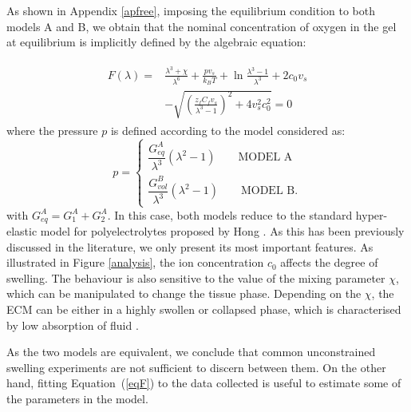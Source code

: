 \documentclass[runningheads]{llncs}
\begin{document}
As shown in Appendix \ref{apfree}, imposing the equilibrium condition to both models A and B, we obtain that the nominal concentration of oxygen in the gel at equilibrium is implicitly defined by the algebraic equation:

\begin{gather}
\begin{aligned}
F(\lambda)=&\frac{\lambda^3+\chi}{\lambda^6}+\frac{p v_s}{k_BT}+\ln \frac{\lambda^3-1}{\lambda^3} +2c_0v_s\\[1.5mm]
&-\sqrt{\left(\frac{z_fC_fv_s}{\lambda^3-1}\right)^2+4v_s^2c^2_0} =0 \label{eqF}
\end{aligned}
\end{gather}
where the pressure $p$ is defined according to the model considered as:
\begin{equation}
p = \begin{cases}
\dfrac{G^A_{eq}}{\lambda^3}(\lambda^2-1)\qquad \text{MODEL A}\\[10pt]
\dfrac{G^B_{vol}}{\lambda^3}(\lambda^2-1)\qquad \text{MODEL B}.
\end{cases}
\end{equation}
with $G^A_{eq}=G^A_1+G^A_2$. In this case, both models reduce to the standard hyper-elastic model for polyelectrolytes proposed by Hong \cite{Reviewpolyel}. As this has been previously discussed in the literature, we only present its most important features. As illustrated in Figure \ref{analysis}, the ion concentration $c_0$ affects the degree of swelling. The behaviour is also sensitive to the value of the mixing parameter $\chi$, which can be manipulated to change the tissue phase. Depending on the $\chi$, the ECM can be either in a highly swollen or collapsed phase, which is characterised by low absorption of fluid \cite{Salt}. 

As the two models are equivalent, we conclude that common unconstrained swelling experiments are not sufficient to discern between them. On the other hand, fitting Equation~(\ref{eqF}) to the data collected is useful to estimate some of the parameters in the model.

%

 
\newpage
\appendix
\end{document}
